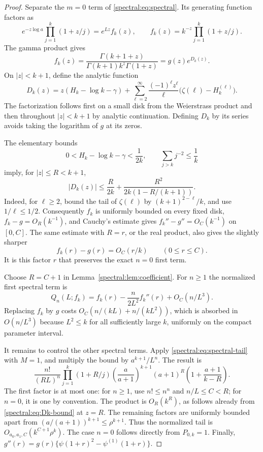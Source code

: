 \begin{proof}
Separate the \(m=0\) term of \eqref{spectral:eq:spectral}. Its generating
function factors as
\[
e^{-z\log a}\prod_{j=1}^k(1+z/j)=e^{Lz}f_k(z),
\qquad
f_k(z)=k^{-z}\prod_{j=1}^k(1+z/j).
\]
The gamma product gives
\[
f_k(z)=\frac{\Gamma(k+1+z)}
 {\Gamma(k+1)k^z\Gamma(1+z)}
      =g(z)e^{D_k(z)}.
\]
On \(|z|<k+1\), define the analytic function
\begin{equation}\label{spectral:eq:Dk}
D_k(z)=z(H_k-\log k-\gamma)
 +\sum_{\ell=2}^{\infty}
   \frac{(-1)^\ell z^\ell}{\ell}
       \bigl(\zeta(\ell)-H_k^{(\ell)}\bigr).
\end{equation}
The factorization follows first on a small disk from the
Weierstrass product and then throughout \(|z|<k+1\) by analytic
continuation. Defining \(D_k\) by its series avoids taking the
logarithm of \(g\) at its zeros.

The elementary bounds
\[
0<H_k-\log k-\gamma<\frac1{2k},\qquad
\sum_{j>k}j^{-2}\le\frac1k
\]
imply, for \(|z|\le R<k+1\),
\begin{equation}\label{spectral:eq:Dk-bound}
|D_k(z)|\le\frac{R}{2k}
   +\frac{R^2}{2k(1-R/(k+1))}.
\end{equation}
Indeed, for \(\ell\ge2\), bound the tail of \(\zeta(\ell)\) by
\((k+1)^{2-\ell}/k\), and use \(1/\ell\le1/2\).
Consequently \(f_k\) is uniformly bounded on every fixed disk,
\(f_k-g=O_R(k^{-1})\), and Cauchy's estimate gives
\(f_k''-g''=O_C(k^{-1})\) on \([0,C]\).
The same estimate with \(R=r\), or the real product, also gives the
slightly sharper
\[
f_k(r)-g(r)=O_C(r/k)\qquad(0\le r\le C).
\]
It is this factor \(r\) that preserves the exact \(n=0\) first term.

Choose \(R=C+1\) in Lemma~\ref{spectral:lem:coefficient}. For \(n\ge1\)
the normalized first spectral term is
\[
Q_n(L;f_k)
=f_k(r)-\frac{n}{2L^2}f_k''(r)+O_C(n/L^3).
\]
Replacing \(f_k\) by \(g\) costs
\(O_C(n/(kL)+n/(kL^2))\), which is absorbed in \(O(n/L^3)\)
because \(L^2\le k\) for all sufficiently large \(k\), uniformly
on the compact parameter interval.

It remains to control the other spectral terms. Apply
\eqref{spectral:eq:spectral-tail} with \(M=1\), and multiply the bound by
\(a^{k+1}/L^n\). The result is
\[
\frac{n!}{(RL)^n}\prod_{j=1}^k(1+R/j)
\left(\frac{a}{a+1}\right)^{k+1}(a+1)^R
\left(1+\frac{a+1}{k-R}\right).
\]
The first factor is at most one: for \(n\ge1\), use
\(n!\le n^n\) and \(n/L\le C<R\); for \(n=0\), it is one by
convention. The product is \(O_R(k^R)\), as follows already from
\eqref{spectral:eq:Dk-bound} at \(z=R\).
The remaining factors are uniformly bounded apart from
\((a/(a+1))^{k+1}\le\rho^{k+1}\). Thus the normalized tail is
\(O_{a_0,a_1,C}(k^{C+1}\rho^k)\). The case \(n=0\) follows
directly from \(P_{0,k}=1\).
Finally,
\(g''(r)=g(r)\{\psi(1+r)^2-\psi^{(1)}(1+r)\}\).
\end{proof}

